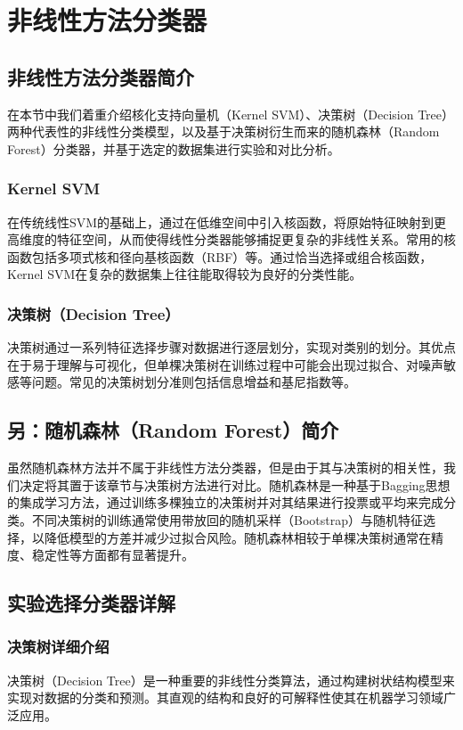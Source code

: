 \documentclass[UTF8]{report}
\theoremstyle{MyLineTheoremStyle} %
\theoremstyle{MyBlockTheoremStyle} %
\theoremstyle{MySubsubsectionStyle} %
\begin{document}
\chapter{非线性方法分类器}
\section{非线性方法分类器简介}
在本节中我们着重介绍核化支持向量机（Kernel SVM）、决策树（Decision Tree）两种代表性的非线性分类模型，以及基于决策树衍生而来的随机森林（Random Forest）分类器，并基于选定的数据集进行实验和对比分析。

\subsection{Kernel SVM}
在传统线性SVM的基础上，通过在低维空间中引入核函数，将原始特征映射到更高维度的特征空间，从而使得线性分类器能够捕捉更复杂的非线性关系。常用的核函数包括多项式核和径向基核函数（RBF）等。通过恰当选择或组合核函数，Kernel SVM在复杂的数据集上往往能取得较为良好的分类性能。

\subsection{决策树（Decision Tree）}
决策树通过一系列特征选择步骤对数据进行逐层划分，实现对类别的划分。其优点在于易于理解与可视化，但单棵决策树在训练过程中可能会出现过拟合、对噪声敏感等问题。常见的决策树划分准则包括信息增益和基尼指数等。
\section{另：随机森林（Random Forest）简介}
虽然随机森林方法并不属于非线性方法分类器，但是由于其与决策树的相关性，我们决定将其置于该章节与决策树方法进行对比。随机森林是一种基于Bagging思想的集成学习方法，通过训练多棵独立的决策树并对其结果进行投票或平均来完成分类。不同决策树的训练通常使用带放回的随机采样（Bootstrap）与随机特征选择，以降低模型的方差并减少过拟合风险。随机森林相较于单棵决策树通常在精度、稳定性等方面都有显著提升。

\section{实验选择分类器详解}

\subsection{决策树详细介绍}

决策树（Decision Tree）是一种重要的非线性分类算法，通过构建树状结构模型来实现对数据的分类和预测。其直观的结构和良好的可解释性使其在机器学习领域广泛应用。
\end{document}
